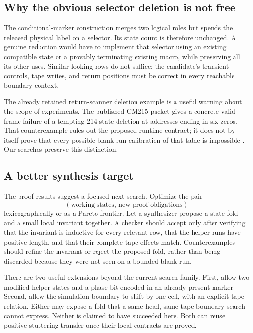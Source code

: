 \documentclass[11pt,letterpaper]{article}
\theoremstyle{definition}\newtheorem{definition}[theorem]{Definition}
\theoremstyle{remark}\newtheorem{remark}[theorem]{Remark}
\begin{document}


\subsection{Why the obvious selector deletion is not free}

The conditional-marker construction merges two logical roles but spends
the released physical label on a selector. Its state count is therefore
unchanged. A genuine reduction would have to implement that selector using
an existing compatible state or a provably terminating existing macro,
while preserving all its other uses. Similar-looking rows do not suffice:
the candidate's transient controls, tape writes, and return positions must
be correct in every reachable boundary context.

The already retained return-scanner deletion example is a useful warning
about the scope of experiments. The published CM215 packet gives a concrete
valid-frame failure of a tempting 214-state deletion at addresses ending
in six zeros. That counterexample rules out the proposed runtime contract;
it does not by itself prove that every possible blank-run calibration of
that table is impossible \cite{marker}. Our searches preserve this
distinction.

\subsection{A better synthesis target}

The proof results suggest a focused next search. Optimize the pair
\[
 (\text{working states},\ \text{new proof obligations})
\]
lexicographically or as a Pareto frontier. Let a synthesizer propose a
state fold and a small local invariant together. A checker should accept
only after verifying that the invariant is inductive for every relevant
row, that the helper runs have positive length, and that their complete
tape effects match. Counterexamples should refine the invariant or reject
the proposed fold, rather than being discarded because they were not seen
on a bounded blank run.

There are two useful extensions beyond the current search family. First,
allow two modified helper states and a phase bit encoded in an already
present marker. Second, allow the simulation boundary to shift by one
cell, with an explicit tape relation. Either may expose a fold that a
same-head, same-tape-boundary search cannot express. Neither is claimed
to have succeeded here. Both can reuse positive-stuttering transfer once
their local contracts are proved.
\end{document}
